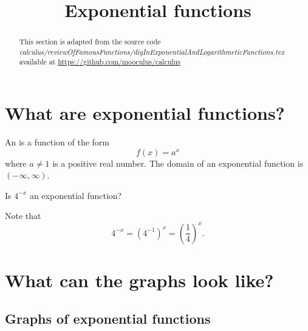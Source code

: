 \documentclass{ximera}
\title[Dig-In:]{Exponential functions}
\begin{document}
\begin{abstract}
This section is adapted from the source code \emph{
        calculus/reviewOfFamousFunctions/digInExponentialAndLogarithmeticFunctions.tex} available at \url{https://github.com/mooculus/calculus}
\end{abstract}
\maketitle
 


\section{What are exponential functions?}
 

\begin{definition}
  An  is a function of the form
  \[
  f(x) = a^x
  \]
  where  $a\ne 1$ is a positive real number. The domain of an
  exponential function is $(-\infty,\infty)$.
\end{definition}

\begin{question}
  Is $4^{-x}$ an exponential function?
  \begin{prompt}
  \begin{multipleChoice}
  \end{multipleChoice}
  \end{prompt}
  \begin{feedback}
    Note that
    \[
    4^{-x} = \left(4^{-1}\right)^x = \left(\frac{1}{4}\right)^x.
    \]
  \end{feedback}
\end{question}



 
\section{What can the graphs look like?}
 
\subsection{Graphs of exponential functions}
 
\end{document}
